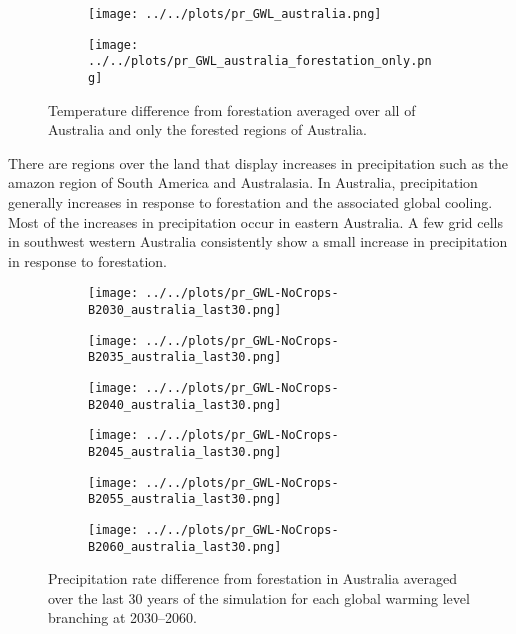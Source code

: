 \documentclass[]{article}
\begin{document}
\begin{figure}[H]
    \centering
    \begin{subfigure}[b]{0.4\linewidth}
        \texttt{[image: ../../plots/pr\_GWL\_australia.png]}
    \end{subfigure}
    \begin{subfigure}[b]{0.4\linewidth}
        \texttt{[image: ../../plots/pr\_GWL\_australia\_forestation\_only.png]}
    \end{subfigure}
    \caption{Temperature difference from forestation averaged over all of Australia and only the forested regions of Australia.}
    \label{fig:pr_australia_timeseries}
\end{figure}

There are regions over the land that display increases in precipitation such as the amazon region of South America and Australasia.
In Australia, precipitation generally increases in response to forestation and the associated global cooling.
Most of the increases in precipitation occur in eastern Australia.
A few grid cells in southwest western Australia consistently show a small increase in precipitation in response to forestation.

\begin{figure}[H]
    \centering
    \begin{subfigure}[b]{0.4\linewidth}
        \texttt{[image: ../../plots/pr\_GWL-NoCrops-B2030\_australia\_last30.png]}
    \end{subfigure}
    \begin{subfigure}[b]{0.4\linewidth}
        \texttt{[image: ../../plots/pr\_GWL-NoCrops-B2035\_australia\_last30.png]}
    \end{subfigure}
    \begin{subfigure}[b]{0.4\linewidth}
        \texttt{[image: ../../plots/pr\_GWL-NoCrops-B2040\_australia\_last30.png]}
    \end{subfigure}
    \begin{subfigure}[b]{0.4\linewidth}
        \texttt{[image: ../../plots/pr\_GWL-NoCrops-B2045\_australia\_last30.png]}
    \end{subfigure}
    \begin{subfigure}[b]{0.4\linewidth}
        \texttt{[image: ../../plots/pr\_GWL-NoCrops-B2055\_australia\_last30.png]}
    \end{subfigure}
    \begin{subfigure}[b]{0.4\linewidth}
        \texttt{[image: ../../plots/pr\_GWL-NoCrops-B2060\_australia\_last30.png]}
    \end{subfigure}
    \caption{Precipitation rate difference from forestation in Australia averaged over the last 30 years of the simulation for each global warming level branching at 2030–2060.}
    \label{fig:pr_australia}
\end{figure}
\end{document}
